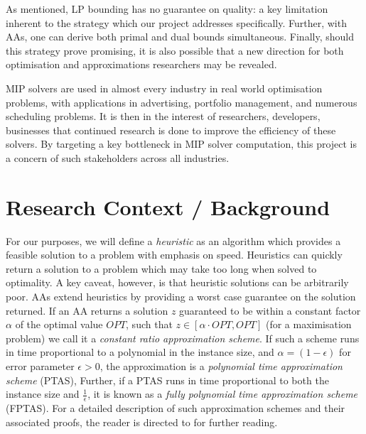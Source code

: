 \documentclass[12pt, a4paper]{article}
\begin{document}
As mentioned, LP bounding has no guarantee on quality: a key limitation inherent to the strategy which our project addresses specifically. Further, with AAs, one can derive both primal and dual bounds simultaneous. Finally, should this strategy prove promising, it is also possible that a new direction for both optimisation and approximations researchers may be revealed. 

MIP solvers are used in almost every industry in real world optimisation problems, with applications in advertising, portfolio management, and numerous scheduling problems. It is then in the interest of researchers, developers, businesses that continued research is done to improve the efficiency of these solvers. By targeting a key bottleneck in MIP solver computation, this project is a concern of such stakeholders across all industries. 

\section{Research Context / Background}

For our purposes, we will define a \textit{heuristic} as an algorithm which provides a feasible solution to a problem with emphasis on speed. Heuristics can quickly return a solution to a problem which may take too long when solved to optimality. A key caveat, however, is that heuristic solutions can be arbitrarily poor. AAs extend heuristics by providing a worst case guarantee on the solution returned. If an AA returns a solution $z$ guaranteed to be within a constant factor $\alpha$ of the optimal value $OPT$, such that $z \in [\alpha \cdot OPT, OPT]$ (for a maximisation problem) we call it a \emph{constant ratio approximation scheme}. If such a scheme runs in time proportional to a polynomial in the instance size, and $\alpha = (1-\epsilon)$ for error parameter $\epsilon > 0$, the approximation is a \emph{polynomial time approximation scheme} (PTAS), Further, if a PTAS runs in time proportional to both the instance size and $\frac{1}{\epsilon}$, it is known as a \emph{fully polynomial time approximation scheme} (FPTAS). For a detailed description of such approximation schemes and their associated proofs, the reader is directed to \cite{BOOK:2} for further reading.
\end{document}
